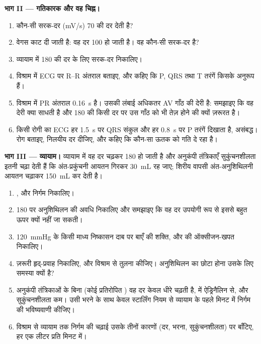 \begin{problem}
\medskip
\noindent\textbf{भाग II --- गतिकारक और वह चिह्न।}
\begin{enumerate}[resume]
  \item कौन-सी सरक-दर (\unit{mV/s}) 70 की दर देती है?
  \item वेगस काट दी जाती है: वह दर 100 हो जाती है। वह कौन-सी सरक-दर
        है?
  \item व्यायाम में 180 की दर के लिए सरक-दर निकालिए।
  \item विश्राम में ECG पर R--R अंतराल बताइए, और कहिए कि
        P, QRS तथा T तरंगें किसके अनुरूप हैं।
  \item विश्राम में PR अंतराल \qty{0.16}{s} है। उसकी लंबाई
        अधिकतर AV गाँठ की देरी है: समझाइए कि वह देरी क्या साधती है
        और 180 की किसी दर पर उस गाँठ को भी तेज़ होने की क्यों ज़रूरत है।
  \item किसी रोगी का ECG हर \qty{1.5}{s} पर QRS संकुल और हर
        \qty{0.8}{s} पर P तरंगें दिखाता है, असंबद्ध। रोग बताइए,
        निलयीय दर दीजिए, और कहिए कि कौन-सा ऊतक
         को गति दे रहा है।
\end{enumerate}

\medskip
\noindent\textbf{भाग III --- व्यायाम।}
व्यायाम में वह दर चढ़कर 180 हो जाती है और अनुकंपी तंत्रिकाएँ
सुकुंचनशीलता इतनी चढ़ा देती हैं कि अंत-प्रकुंचनी आयतन गिरकर
\qty{30}{mL} रह जाए; शिरीय वापसी अंत-अनुशिथिलनी आयतन चढ़ाकर
\qty{150}{mL} कर देती है।
\begin{enumerate}[resume]
  \item {},  और निर्गम निकालिए।
  \item 180 पर अनुशिथिलन की अवधि निकालिए और समझाइए कि वह
        दर उपयोगी रूप से इससे बहुत ऊपर क्यों नहीं जा सकती।
  \item \qty{120}{mmHg} के किसी माध्य निष्कासन दाब पर बाएँ 
        की शक्ति, और  की ऑक्सीजन-खपत
        निकालिए।
  \item ज़रूरी हृद्-प्रवाह निकालिए, और विश्राम से तुलना कीजिए।
        अनुशिथिलन का छोटा होना उसके लिए समस्या क्यों है?
  \item अनुकंपी तंत्रिकाओं के बिना (कोई प्रतिरोपित ) वह
        दर केवल धीरे चढ़ती है,  में ऐड्रिनैलिन से, और
        सुकुंचनशीलता कम। उसी भरने के साथ केवल स्टार्लिंग नियम से
        व्यायाम के पहले मिनट में निर्गम की भविष्यवाणी कीजिए।
  \item विश्राम से व्यायाम तक निर्गम की चढ़ाई उसके तीनों
        कारणों (दर, भरना, सुकुंचनशीलता) पर बाँटिए, हर एक लीटर प्रति
        मिनट में।
\end{enumerate}


\end{problem}
